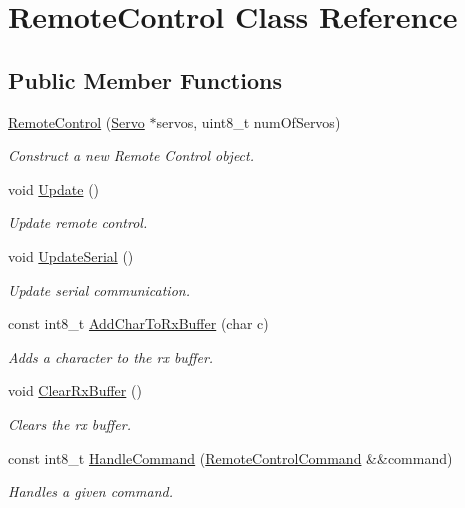 \hypertarget{classRemoteControl}{}\section{Remote\+Control Class Reference}
\label{classRemoteControl}
\subsection*{Public Member Functions}
\begin{DoxyCompactItemize}
\item 
\mbox{\hyperlink{classRemoteControl_a5d0cf2268dbecaae9b2526b6a9ea4e58}{Remote\+Control}} (\mbox{\hyperlink{classServo}{Servo}} $\ast$servos, uint8\+\_\+t num\+Of\+Servos)
\begin{DoxyCompactList}\small\item\em Construct a new Remote Control object. \end{DoxyCompactList}\item 
void \mbox{\hyperlink{classRemoteControl_aa513b841c71c24aaa9637e58ece1be53}{Update}} ()
\begin{DoxyCompactList}\small\item\em Update remote control. \end{DoxyCompactList}\item 
void \mbox{\hyperlink{classRemoteControl_ae53e5ef85ab672a133bd4485fb7ff8cd}{Update\+Serial}} ()
\begin{DoxyCompactList}\small\item\em Update serial communication. \end{DoxyCompactList}\item 
const int8\+\_\+t \mbox{\hyperlink{classRemoteControl_a56e3105d14f9150e8c08ff2f6f480c85}{Add\+Char\+To\+Rx\+Buffer}} (char c)
\begin{DoxyCompactList}\small\item\em Adds a character to the rx buffer. \end{DoxyCompactList}\item 
void \mbox{\hyperlink{classRemoteControl_a2c903c1cce31327c040450f0ce9ef558}{Clear\+Rx\+Buffer}} ()
\begin{DoxyCompactList}\small\item\em Clears the rx buffer. \end{DoxyCompactList}\item 
const int8\+\_\+t \mbox{\hyperlink{classRemoteControl_a0117ce47c6b69ad679b6570930b89e9d}{Handle\+Command}} (\mbox{\hyperlink{classRemoteControlCommand}{Remote\+Control\+Command}} \&\&command)
\begin{DoxyCompactList}\small\item\em Handles a given command. \end{DoxyCompactList}\end{DoxyCompactItemize}


